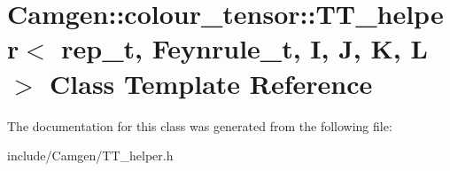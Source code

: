 \hypertarget{a00550}{}\section{Camgen\+:\+:colour\+\_\+tensor\+:\+:T\+T\+\_\+helper$<$ rep\+\_\+t, Feynrule\+\_\+t, I, J, K, L $>$ Class Template Reference}
\label{a00550}


The documentation for this class was generated from the following file\+:\begin{DoxyCompactItemize}
\item 
include/\+Camgen/T\+T\+\_\+helper.\+h\end{DoxyCompactItemize}
